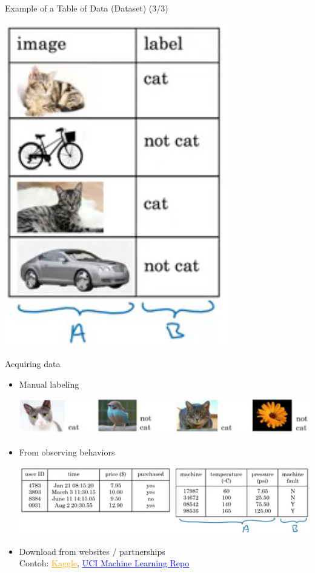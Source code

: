 \documentclass[pdf]{beamer}
\theoremstyle{mystyle}
\begin{document}
\begin{frame}{Example of a Table of Data (Dataset) (3/3)}
	\begin{table}[!ht]
		\centering
		\includegraphics[scale=.3]{example-dataset-3}
		\caption{Cat images dataset~\citep{ng2019AIForEveryone}}
		\label{fig:example-dataset-3}
	\end{table}
\end{frame}

\begin{frame}{Acquiring data}
	\begin{itemize}
		\item<2-> Manual labeling
		\begin{center}
			\includegraphics[scale=.3]{manual-labeling}
		\end{center}
		\item<3-> From observing behaviors
		\begin{center}
			\includegraphics[scale=.35]{observing-behaviors}
		\end{center}
		\item<4-> Download from websites / partnerships \\
		Contoh: \href{https://www.kaggle.com/datasets}{\textcolor{orange}{\underline{ Kaggle}}}, \href{http://archive.ics.uci.edu/ml/datasets.php}{\textcolor{blue}{\underline{UCI Machine Learning Repo}}}		
	\end{itemize}
\end{frame}
\end{document}
